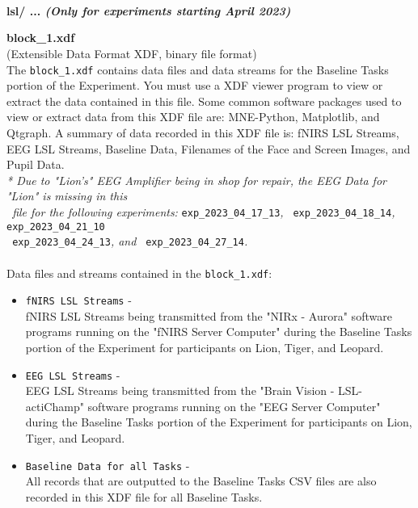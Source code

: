 \begin{description}
\textbf{\\\\\\}
\item\textbf{lsl/ ... \textit{(Only for experiments starting April 2023)}}
\begin{addmargin}[0em]{0em}
    \label{block_1.xdf}
    \textbf{block\_1.xdf}\\(Extensible Data Format XDF, binary file format)\\
    The \verb|block_1.xdf| contains data files and data streams for the Baseline Tasks portion of the Experiment.
    You must use a XDF viewer program to view or extract the data contained in this file.
    Some common software packages used to view or extract data from this XDF file are: MNE-Python, Matplotlib, and Qtgraph.
    A summary of data recorded in this XDF file is: fNIRS LSL Streams, EEG LSL Streams, Baseline Data,
    Filenames of the Face and Screen Images, and Pupil Data.\\
    \textit{* Due to "Lion's" EEG Amplifier being in shop for repair, the EEG Data for "Lion" is missing in this}\\
    \verb| |\textit{file for the following experiments: }\verb|exp_2023_04_17_13|\textit{, }\verb| exp_2023_04_18_14|\textit{, }\verb| exp_2023_04_21_10|\\
    \verb| exp_2023_04_24_13|\textit{, and }\verb| exp_2023_04_27_14|\textit{.}\\\\
    Data files and streams contained in the \verb|block_1.xdf|:
    \begin{itemize}
        \item \verb|fNIRS LSL Streams| -\\fNIRS LSL Streams being transmitted from the "NIRx - Aurora" software programs running on the "fNIRS Server Computer" during the Baseline Tasks portion of the Experiment for participants on Lion, Tiger, and Leopard.
        \item \verb|EEG LSL Streams| -\\EEG LSL Streams being transmitted from the "Brain Vision - LSL-actiChamp" software programs running on the "EEG Server Computer" during the Baseline Tasks portion of the Experiment for participants on Lion, Tiger, and Leopard.
        \item \verb|Baseline Data for all Tasks| -\\All records that are outputted to the Baseline Tasks CSV files are also recorded in this XDF file for all Baseline Tasks.

\end{itemize}
\end{addmargin}
\end{description}
